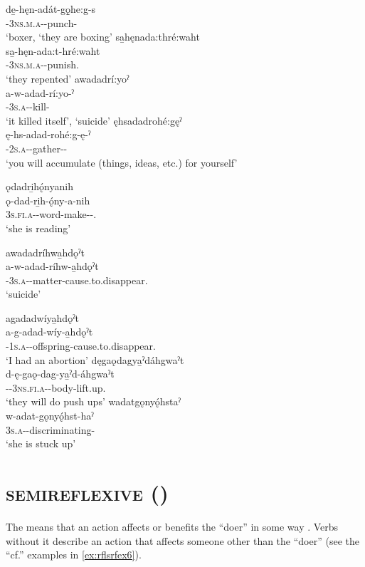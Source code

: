 \gll de̱-hęn-adát-gǫ̱he:g-s\\
 {\dualic}-\textsc{3ns.m.a}-{}-punch-{\habitual}\\
\glt ‘boxer, `they are boxing'
\ex sa̱hęnada:thré:waht\\
\gll sa̱-hęn-ada:t-hré:waht\\
 {\repetitive}-\textsc{3ns.m.a}-{}-punish.{\zeropunctual}\\
\glt `they repented'
\ex awadadrí:yoˀ \\
\gll a-w-adad-rí:yo-ˀ\\
 {\factual}-\textsc{3s.a}-{}-kill-{\punctual}\\
\glt ‘it killed itself’, `suicide'
\ex ęhsadadrohé:gęˀ\\
\gll ę-hs-adad-rohé:g-ę-ˀ\\
 \fut-\textsc{2s.a}-{}-gather-{\benefactive}-{\punctual}\\
\glt `you will accumulate (things, ideas, etc.) for yourself'

\ex ǫdadri̱hǫ́nyanih\\
\gll ǫ-dad-ri̱h-ǫ́ny-a-nih\\
 \textsc{3s.fi.a}-{}-word-make-\textsc{\joinerA-\benefactive.\habitual}\\
\glt `she is reading'

\ex awadadríhwa̱hdǫˀt\\
\gll a-w-adad-ríhw-a̱hdǫˀt\\
{\factual}-\textsc{3s.a}-{}-matter-cause.to.\-disappear.{\zeropunctual}\\
\glt ‘suicide’

\ex agadadwíya̱hdǫˀt\\
\gll a-g-adad-wíy-a̱hdǫˀt\\
 {\factual}-\textsc{1s.a}-{}-offspring-cause.to.\-disappear.{\zeropunctual}\\
\glt `I had an abortion'
\ex dęgaǫdagya̱ˀdáhgwaˀt\\
\gll d-ę-gaǫ-dag-ya̱ˀd-áhgwaˀt\\
 {\dualic}-{\future}-\textsc{3ns.fi.a}-{}-body-lift.up.{\zeropunctual}\\
\glt `they will do push ups'
\ex wadatgǫnyǫ́hstaˀ\\
\gll w-adat-gǫnyǫ́hst-haˀ\\
 \textsc{3s.a}-{}-discriminating-{\habitual}\\
\glt `she is stuck up'
\z
\zlast


\largerpage[1.5]
\section{ \textsc{semireflexive} (\semireflexive)} \label{[ad-] (semireflexive) prefix}
The  \textsc{\semireflexive} means that an action affects or benefits the “doer” in some way . Verbs without it describe an action that affects someone other than the “doer” (see the “cf.” examples in \ref{ex:rflsrfex6}).\clearpage

